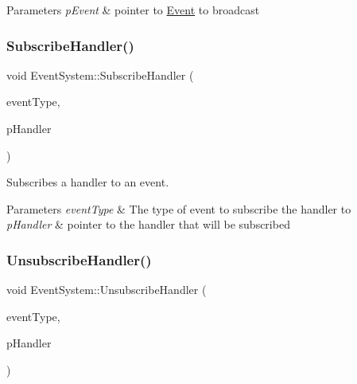 \begin{DoxyParams}{Parameters}
{\em p\+Event} & pointer to \mbox{\hyperlink{struct_event}{Event}} to broadcast \\
\hline
\end{DoxyParams}
\mbox{\label{class_event_system_a25048a2cae1066f84ce0e0c7aecf6314}} 
\subsubsection{\texorpdfstring{Subscribe\+Handler()}{SubscribeHandler()}}
{\footnotesize\ttfamily void Event\+System\+::\+Subscribe\+Handler (\begin{DoxyParamCaption}\item[{const Event\+::\+Type \&}]{event\+Type,  }\item[{\mbox{\hyperlink{class_i_event_handler}{I\+Event\+Handler}} $\ast$}]{p\+Handler }\end{DoxyParamCaption})\hspace{0.3cm}{\ttfamily [static]}}



Subscribes a handler to an event. 


\begin{DoxyParams}{Parameters}
{\em event\+Type} & The type of event to subscribe the handler to \\
\hline
{\em p\+Handler} & pointer to the handler that will be subscribed \\
\hline
\end{DoxyParams}
\mbox{\label{class_event_system_ae8ebabb2d7e4604b3d5f666d9bcb1d32}} 
\subsubsection{\texorpdfstring{Unsubscribe\+Handler()}{UnsubscribeHandler()}}
{\footnotesize\ttfamily void Event\+System\+::\+Unsubscribe\+Handler (\begin{DoxyParamCaption}\item[{const Event\+::\+Type \&}]{event\+Type,  }\item[{\mbox{\hyperlink{class_i_event_handler}{I\+Event\+Handler}} $\ast$}]{p\+Handler }\end{DoxyParamCaption})\hspace{0.3cm}{\ttfamily [static]}}



